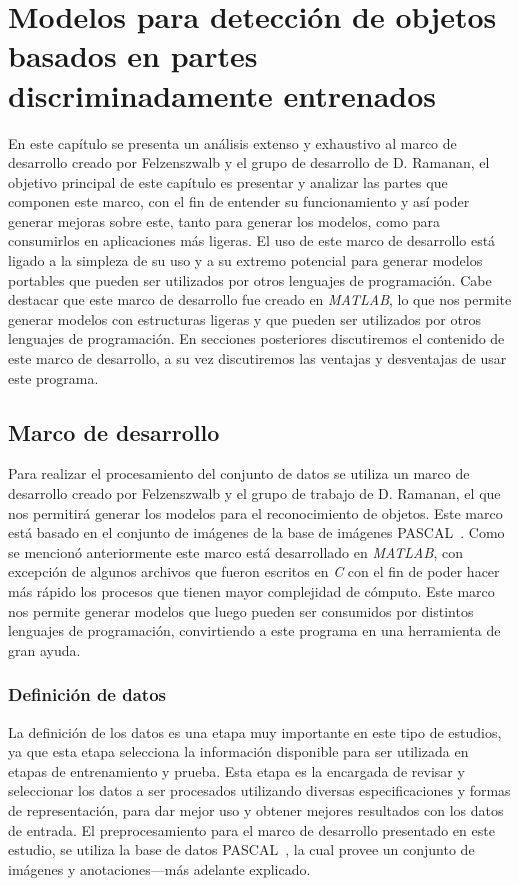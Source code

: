 \chapter[Modelos basados en partes ]{Modelos para detección de objetos basados en partes discriminadamente entrenados }\label{ch:capitulo4}
En este capítulo se presenta un análisis extenso y exhaustivo al marco de desarrollo creado por Felzenszwalb y el grupo de desarrollo de D. Ramanan, el objetivo principal de este capítulo es presentar y analizar las partes que componen este marco, con el fin de entender su funcionamiento y así poder generar mejoras sobre este, tanto para generar los modelos, como para consumirlos en aplicaciones más ligeras. El uso de este marco de desarrollo está ligado a la simpleza de su uso y a su extremo potencial para generar modelos portables que pueden ser utilizados por otros lenguajes de programación. Cabe destacar que este marco de desarrollo fue creado en \textit{MATLAB}, lo que nos permite generar modelos con estructuras ligeras y que pueden ser utilizados por otros lenguajes de programación. En secciones posteriores discutiremos el contenido de este marco de desarrollo, a su vez discutiremos las ventajas y desventajas de usar este programa.

\section{Marco de desarrollo}\label{sec:framework}
Para realizar el procesamiento del conjunto de datos se utiliza un marco de desarrollo creado por Felzenszwalb y el grupo de trabajo de D. Ramanan, el que nos permitirá generar los modelos para el reconocimiento de objetos. Este marco está basado en el conjunto de imágenes de la base de imágenes PASCAL~\cite{Everingham2010}. Como se mencionó anteriormente este marco está desarrollado en \textit{MATLAB}, con excepción de algunos archivos que fueron escritos en \textit{C} con el fin de poder hacer más rápido los procesos que tienen mayor complejidad de cómputo. Este marco nos permite generar modelos que luego pueden ser consumidos por distintos lenguajes de programación, convirtiendo a este programa en una herramienta de gran ayuda.

\subsection{Definición de datos}\label{sec:datos}
La definición de los datos es una etapa muy importante en este tipo de estudios, ya que esta etapa selecciona la información disponible para ser utilizada en etapas de entrenamiento y prueba. Esta etapa es la encargada de revisar y seleccionar los datos a ser procesados utilizando diversas especificaciones y formas de representación, para dar mejor uso y obtener mejores resultados con los datos de entrada. El preprocesamiento para el marco de desarrollo presentado en este estudio, se utiliza la base de datos PASCAL~\cite{Everingham2010}, la cual provee un conjunto de imágenes y anotaciones---más adelante explicado.

